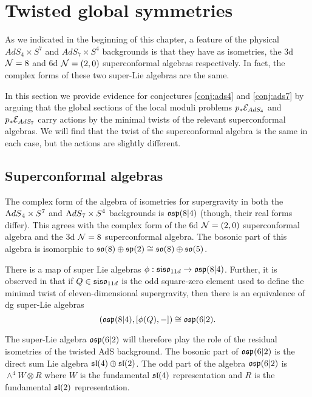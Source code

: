 \documentclass[../main.tex]{subfiles}
\begin{document}
 

\section{Twisted global symmetries}
\label{sec:ads}
As we indicated in the beginning of this chapter, a feature of the physical $AdS_4\times S^7$ and $AdS_7\times S^4$ backgrounds is that they have as isometries, the 3d $\mathcal{N}=8$ and 6d $\mathcal{N}=(2,0)$ superconformal algebras respectively. In fact, the complex forms of these two super-Lie algebras are the same. 

In this section we provide evidence for conjectures \ref{conj:ads4} and \ref{conj:ads7} by arguing that the global sections of the local moduli problems $p_*\mathcal{E}_{AdS_4}$ and $p_* \mathcal{E}_{AdS_7}$ carry actions by the minimal twists of the relevant superconformal algebras. We will find that the twist of the superconformal algebra is the same in each case, but the actions are slightly different. 

\subsection{Superconformal algebras}

The complex form of the algebra of isometries for supergravity in both the ${\mathrm{A}dS}_4 \times S^7$ and ${\mathrm{A}dS}_7 \times S^4$ backgrounds is $\mathfrak{osp}(8|4)$ (though, their real forms differ). 
This agrees with the complex form of the 6d $\mathcal{N}=(2,0)$ superconformal algebra and the 3d $\mathcal{N}=8$ superconformal algebra. The bosonic part of this algebra is isomorphic to $\mathfrak{so}(8) \oplus \mathfrak{sp}(2) \cong \mathfrak{so}(8) \oplus \mathfrak{so}(5)$. 

There is a map of super Lie algebras $\phi: \mathfrak{siso}_{11d} \to \mathfrak{osp}(8|4)$. 
Further, it is observed in \cite{SWsuco2} that if $Q\in \mathfrak{siso}_{11d}$ is the odd square-zero element used to define the minimal twist of eleven-dimensional supergravity, then there is an equivalence of dg super-Lie algebras \[\left ( \mathfrak{osp}(8|4), [\phi(Q), - ]\right )\cong \mathfrak{osp}(6|2).\]

The super-Lie algebra $\mathfrak{osp}(6|2)$ will therefore play the role of the residual isometries of the twisted AdS background. The bosonic part of $\mathfrak{osp}(6|2)$ is the direct sum Lie algebra $\mathfrak{sl}(4) \oplus \mathfrak{sl}(2)$. The odd part of the algebra $\mathfrak{osp}(6|2)$ is $\wedge^4 W \otimes R$ where $W$ is the fundamental $\mathfrak{sl}(4)$ representation and $R$ is the fundamental $\mathfrak{sl}(2)$ representation. 
\end{document}
